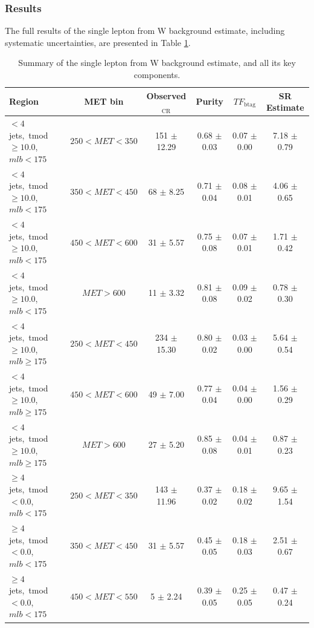 \subsubsection{Results}
\label{sssec:stop:1lw:results}

The full results of the single lepton from W background estimate,
including systematic uncertainties, are presented in Table
\ref{tab:stop:1lw:results}.

\begin{table}
\centering
\small
\caption{Summary of the single lepton from W background estimate, and
  all its key components.}
\label{tab:stop:1lw:results}
\begin{tabular}{|l|c|c|c|c|c|} \hline
Region & MET bin & Observed$_\text{CR}$ & Purity & $TF_\text{btag}$ & SR Estimate \\ \hline \hline
 $<4$jets,~tmod$\ge10.0$,~$mlb<175$        & $250<MET<350$ & 151 $\pm$ 12.29 & 0.68 $\pm$ 0.03  & 0.07 $\pm$ 0.00 & 7.18 $\pm$ 0.79 \\
 $<4$jets,~tmod$\ge10.0$,~$mlb<175$        & $350<MET<450$ & 68 $\pm$ 8.25   & 0.71 $\pm$ 0.04  & 0.08 $\pm$ 0.01 & 4.06 $\pm$ 0.65 \\
 $<4$jets,~tmod$\ge10.0$,~$mlb<175$        & $450<MET<600$ & 31 $\pm$ 5.57   & 0.75 $\pm$ 0.08  & 0.07 $\pm$ 0.01 & 1.71 $\pm$ 0.42 \\
 $<4$jets,~tmod$\ge10.0$,~$mlb<175$        & $MET>600$     & 11 $\pm$ 3.32   & 0.81 $\pm$ 0.08  & 0.09 $\pm$ 0.02 & 0.78 $\pm$ 0.30 \\
\hline
 $<4$jets,~tmod$\ge10.0$,~$mlb\ge175$      & $250<MET<450$ & 234 $\pm$ 15.30 & 0.80 $\pm$ 0.02  & 0.03 $\pm$ 0.00 & 5.64 $\pm$ 0.54 \\
 $<4$jets,~tmod$\ge10.0$,~$mlb\ge175$      & $450<MET<600$ & 49 $\pm$ 7.00   & 0.77 $\pm$ 0.04  & 0.04 $\pm$ 0.00 & 1.56 $\pm$ 0.29 \\
 $<4$jets,~tmod$\ge10.0$,~$mlb\ge175$      & $MET>600$     & 27 $\pm$ 5.20   & 0.85 $\pm$ 0.08  & 0.04 $\pm$ 0.01 & 0.87 $\pm$ 0.23 \\
\hline
 $\ge4$jets,~tmod$<0.0$,~$mlb<175$         & $250<MET<350$ & 143 $\pm$ 11.96 & 0.37 $\pm$ 0.02  & 0.18 $\pm$ 0.02 & 9.65 $\pm$ 1.54 \\
 $\ge4$jets,~tmod$<0.0$,~$mlb<175$         & $350<MET<450$ & 31 $\pm$ 5.57   & 0.45 $\pm$ 0.05  & 0.18 $\pm$ 0.03 & 2.51 $\pm$ 0.67 \\
 $\ge4$jets,~tmod$<0.0$,~$mlb<175$         & $450<MET<550$ & 5 $\pm$ 2.24    & 0.39 $\pm$ 0.05  & 0.25 $\pm$ 0.05 & 0.47 $\pm$ 0.24 \\

\end{tabular}
\end{table}
